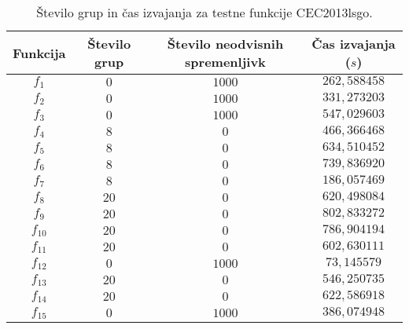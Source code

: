 
\begin{table}[t]
    \centering
    \caption{Število grup in čas izvajanja za testne funkcije CEC2013lsgo.} \label{tab:bech:func_basic_stats}
    \begin{tabular}{|c|c|c|c|}
        \hline
        Funkcija & Število grup & Število neodvisnih spremenljivk & Čas izvajanja ($s$) \\\hline
        $f_1$    & $0$  & $1000$ & $262{,}588458$ \\\hline
        $f_2$    & $0$  & $1000$ & $331{,}273203$ \\\hline
        $f_3$    & $0$  & $1000$ & $547{,}029603$ \\\hline
        $f_4$    & $8$  & $0$    & $466{,}366468$ \\\hline
        $f_5$    & $8$  & $0$    & $634{,}510452$ \\\hline
        $f_6$    & $8$  & $0$    & $739{,}836920$ \\\hline
        $f_7$    & $8$  & $0$    & $186{,}057469$ \\\hline
        $f_8$    & $20$ & $0$    & $620{,}498084$ \\\hline
        $f_9$    & $20$ & $0$    & $802{,}833272$ \\\hline
        $f_{10}$ & $20$ & $0$    & $786{,}904194$ \\\hline
        $f_{11}$ & $20$ & $0$    & $602{,}630111$ \\\hline
        $f_{12}$ & $0$  & $1000$ & $73{,}145579$  \\\hline
        $f_{13}$ & $20$ & $0$    & $546{,}250735$ \\\hline
        $f_{14}$ & $20$ & $0$    & $622{,}586918$ \\\hline
        $f_{15}$ & $0$  & $1000$ & $386{,}074948$ \\\hline
    \end{tabular}
\end{table}

